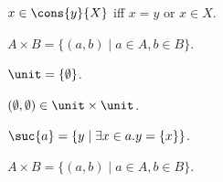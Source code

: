 \begin{axiom}\label{cons}
    $x\in \cons{y}{X}$ iff $x = y$ or $x\in X$.
\end{axiom}

\begin{definition}\label{times}
    $A\times B = \{ (a,b) \mid a\in A, b\in B\}$.
\end{definition}

\begin{definition}\label{unit}
    $\unit = \{\emptyset\}$.
\end{definition}

\begin{proposition}\label{pair_emptyset_in_times_unit}
    $(\emptyset,\emptyset)\in \unit\times\unit$.
\end{proposition}


\begin{definition}\label{suc}
    $\suc{a} = \{ y \mid \exists x\in a. y = \{x\} \}$.
\end{definition}


\begin{proposition}\label{times_replacement_test}
    $A\times B = \{ (a,b) \mid a\in A, b\in B\}$.
\end{proposition}
